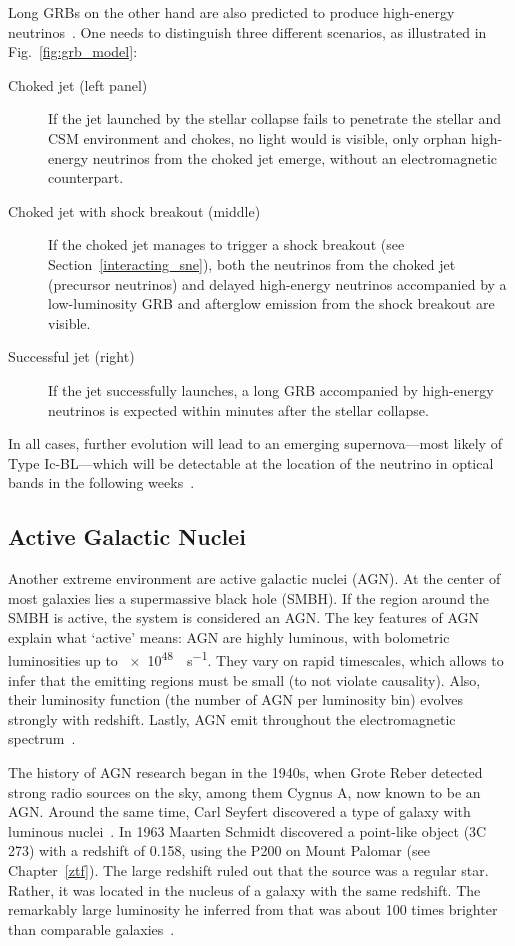 Long GRBs on the other hand are also predicted to produce high-energy neutrinos~. One needs to distinguish three different scenarios, as illustrated in Fig.~\ref{fig:grb_model}:
\begin{description}
  \item[Choked jet (left panel)] If the jet launched by the stellar collapse fails to penetrate the stellar and CSM environment and chokes, no light would is visible, only orphan high-energy neutrinos from the choked jet emerge, without an electromagnetic counterpart.
  \item[Choked jet with shock breakout (middle)] If the choked jet manages to trigger a shock breakout (see Section~\ref{interacting_sne}), both the neutrinos from the choked jet (precursor neutrinos) and delayed high-energy neutrinos accompanied by a low-luminosity GRB and afterglow emission from the shock breakout are visible.
  \item[Successful jet (right)] If the jet successfully launches, a long GRB accompanied by high-energy neutrinos is expected within minutes after the stellar collapse.
\end{description}

In all cases, further evolution will lead to an emerging supernova---most likely of Type Ic-BL---which will be detectable at the location of the neutrino in optical bands in the following weeks~.

\subsection{Active Galactic Nuclei}\label{agn}
Another extreme environment are active galactic nuclei (AGN). At the center of most galaxies lies a supermassive black hole (SMBH). If the region around the SMBH is active, the system is considered an AGN. The key features of AGN explain what `active' means: AGN are highly luminous, with bolometric luminosities up to \SI{e48}{\erg\per\s}. They vary on rapid timescales, which allows to infer that the emitting regions must be small (to not violate causality). Also, their luminosity function (the number of AGN per luminosity bin) evolves strongly with redshift. Lastly, AGN emit throughout the electromagnetic spectrum~.

The history of AGN research began in the 1940s, when Grote Reber detected strong radio sources on the sky, among them Cygnus A, now known to be an AGN. Around the same time, Carl Seyfert discovered a type of galaxy with luminous nuclei~. In 1963 Maarten Schmidt discovered a point-like object (3C 273) with a redshift of 0.158, using the P200 on Mount Palomar (see Chapter~\ref{ztf}). The large redshift ruled out that the source was a regular star. Rather, it was located in the nucleus of a galaxy with the same redshift. The remarkably large luminosity he inferred from that was about 100 times brighter than comparable galaxies~.

